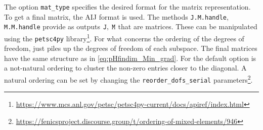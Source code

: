 The option \verb|mat_type| specifies the desired format for the matrix representation. To get a final {} matrix, the AIJ format is used. The methods \verb|J.M.handle|, \verb|M.M.handle| provide as outputs $\verb|J|, \; \verb|M|$ that are {} matrices. These can be manipulated using the \verb|petsc4py| library\footnote{\url{https://www.mcs.anl.gov/petsc/petsc4py-current/docs/apiref/index.html}}. For what concerns the ordering of the degrees of freedom, \firedrake just piles up the degrees of freedom of each subspace. The final matrices have the same structure as in \eqref{eq:pHfindim_Min_grad}. For \fenics the default option is a not-natural ordering to cluster the non-zero entries closer to the diagonal. A natural ordering can be set by changing the \verb|reorder_dofs_serial| parameters\footnote{\url{https://fenicsproject.discourse.group/t/ordering-of-mixed-elements/946}}.


